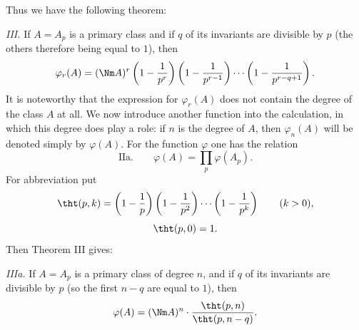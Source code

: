 Thus we have the following theorem:

\emph{III.} If $A=A_p$ is a primary class and if $q$ of its invariants are divisible by $p$ (the others therefore being equal to $1$), then
\[
 \varphi_r(A)=(\Nm A)^r
 \left(1-{1\over p^r}\right)
 \left(1-{1\over p^{r-1}}\right)
 \cdots
 \left(1-{1\over p^{r-q+1}}\right).
\]
It is noteworthy that the expression for $\varphi_r(A)$ does not contain the degree of the class $A$ at all. We now introduce another function into the calculation, in which this degree does play a role: if $n$ is the degree of $A$, then $\varphi_n(A)$ will be denoted simply by $\varphi(A)$. For the function $\varphi$ one has the relation
\[
\text{IIa.}\qquad
 \varphi(A)=\prod_p \varphi(A_p).
\]
For abbreviation put
\[
 \tht(p,k)=\left(1-{1\over p}\right)
 \left(1-{1\over p^2}\right)\cdots
 \left(1-{1\over p^k}\right)\qquad (k>0),
\]
\[
 \tht(p,0)=1.
\]
Then Theorem III gives:

\emph{IIIa.} If $A=A_p$ is a primary class of degree $n$, and if $q$ of its invariants are divisible by $p$ (so the first $n-q$ are equal to $1$), then
\[
 \varphi(A)=(\Nm A)^n\cdot {\tht(p,n)\over \tht(p,n-q)}.
\]
